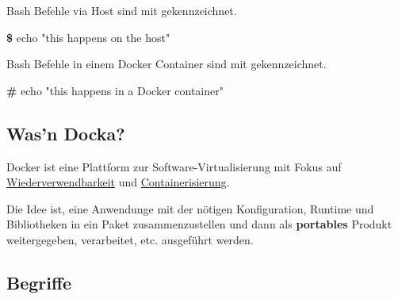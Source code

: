 \documentclass[
  10pt,
  a4paper,
]{article}
\newenvironment{Shaded}{}{}
\newcommand{\ExtensionTok}[1]{\textcolor[rgb]{0.84,0.23,0.29}{\textbf{#1}}}
\newcommand{\NormalTok}[1]{\textcolor[rgb]{0.14,0.16,0.18}{#1}}
\newcommand{\StringTok}[1]{\textcolor[rgb]{0.01,0.18,0.38}{#1}}
\begin{document}
\begin{multicols*}{2}
\begin{tcolorbox}
Bash Befehle via Host sind mit {\color{BrickRed}{\texttt{\textbf{\$}}}}
gekennzeichnet.

\begin{Shaded}
\begin{Highlighting}[]
\ExtensionTok{\$}\NormalTok{ echo }\StringTok{"this happens on the host"}
\end{Highlighting}
\end{Shaded}

Bash Befehle in einem Docker Container sind mit
{\color{BrickRed}{\texttt{\textbf{\#}}}} gekennzeichnet.

\begin{Shaded}
\begin{Highlighting}[]
\ExtensionTok{\#}\NormalTok{ echo }\StringTok{"this happens in a Docker container"}
\end{Highlighting}
\end{Shaded}

\end{tcolorbox}

\subsection{Was'n Docka?}\label{wasn-docka}

Docker ist eine Plattform zur Software-Virtualisierung mit Fokus auf
\ul{Wiederverwendbarkeit} und \ul{Containerisierung}.

Die Idee ist, eine Anwendunge mit der nötigen Konfiguration, Runtime und
Bibliotheken in ein Paket zusammenzustellen und dann als
\textbf{portables} Produkt weitergegeben, verarbeitet, etc. ausgeführt
werden.

\subsection{Begriffe}\label{begriffe}


\end{multicols*}
\end{document}
